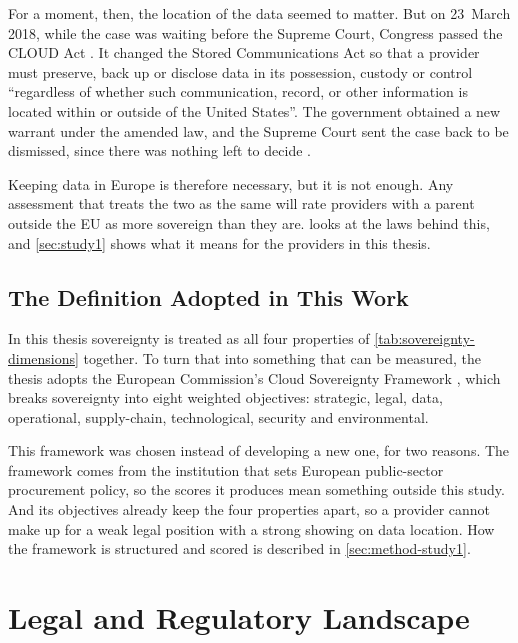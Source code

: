 For a moment, then, the location of the data seemed to matter.
But on 23~March 2018, while the case was waiting before the Supreme Court, Congress
passed the \ac{CLOUD Act} \cite{CLOUDAct_2018}. It changed the Stored
Communications Act so that a provider must preserve, back up or disclose data in
its possession, custody or control \enquote{regardless of whether such
communication, record, or other information is located within or outside of the
United States}. The government obtained a new warrant under the amended law, and
the Supreme Court sent the case back to be dismissed, since there was nothing left
to decide \cite{MicrosoftIreland_SCOTUS_2018}.

Keeping data in Europe is therefore necessary, but it is not enough. Any assessment
that treats the two as the same will rate providers with a parent outside the
\ac{EU} as more sovereign than they are.  looks at the
laws behind this, and \cref{sec:study1} shows what it means for the providers in
this thesis.

\subsection{The Definition Adopted in This Work}
\label{subsec:definition-adopted}

In this thesis sovereignty is treated as all four properties of
\cref{tab:sovereignty-dimensions} together. To turn that into something that can be
measured, the thesis adopts the European Commission's Cloud Sovereignty Framework
\cite{EC_DIGIT_CloudSovereignty_2025}, which breaks sovereignty into eight weighted
objectives: strategic, legal, data, operational, supply-chain, technological,
security and environmental.

This framework was chosen instead of developing a new one, for two reasons. The
framework comes from the institution that sets European public-sector procurement
policy, so the scores it produces mean something outside this study. And its
objectives already keep the four properties apart, so a provider cannot make up
for a weak legal position with a strong showing on data location. How the
framework is structured and scored is described in \cref{sec:method-study1}.

\section{Legal and Regulatory Landscape}
\label{sec:legal-landscape}

